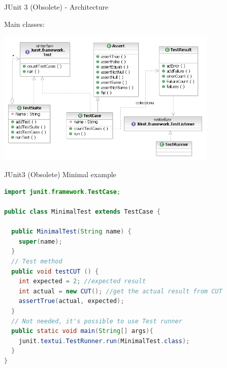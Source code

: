 \documentclass[11pt, xcolor=svgnames]{beamer}
\begin{document}

\begin{frame}[fragile]{JUnit 3 (Obsolete) - Architecture }

Main classes: 

\begin{center}
  \includegraphics[width=300pt]{./figs/UMLJUnit3}
\end{center}
 
\end{frame}


\begin{frame}[fragile]{JUnit3 (Obsolete) Minimal example}

\begin{center}

\begin{lstlisting}[language=Java,basicstyle=\scriptsize]
import junit.framework.TestCase;

public class MinimalTest extends TestCase {

  public MinimalTest(String name) {
    super(name);
  }
  // Test method
  public void testCUT () {
    int expected = 2; //expected result
    int actual = new CUT(); //get the actual result from CUT
    assertTrue(actual, expected);
  }
  // Not needed, it's possible to use Test runner
  public static void main(String[] args){
    junit.textui.TestRunner.run(MinimalTest.class);
  }
}
\end{lstlisting}
\end{center}

\end{frame}

\end{document}
